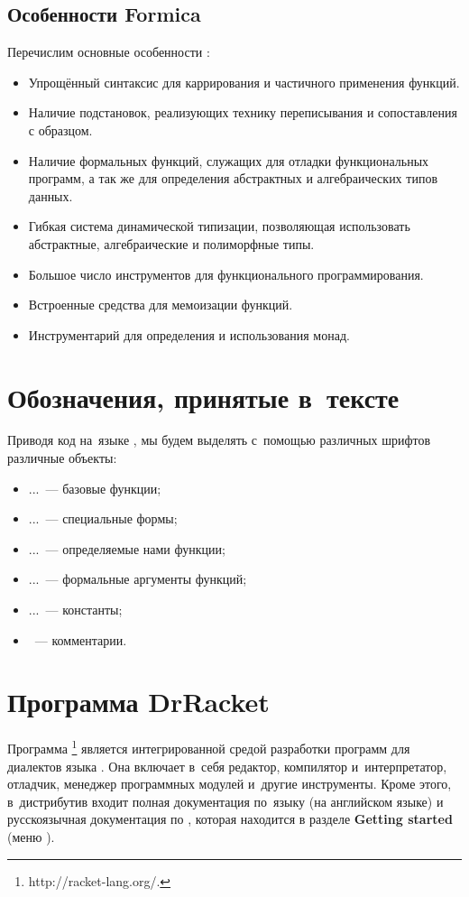 \subsection{Особенности Formica}%
Перечислим основные особенности \FLP:

\begin{itemize}
  \item Упрощённый синтаксис для каррирования и частичного применения функций.
  \item Наличие подстановок, реализующих технику переписывания и сопоставления с образцом.
  \item Наличие формальных функций, служащих для отладки функциональных программ, а так же для определения абстрактных и алгебраических типов данных.
  \item Гибкая система динамической типизации, позволяющая использовать абстрактные, алгебраические и полиморфные \mbox{типы}.
  \item Большое число инструментов для функционального программирования.
  \item Встроенные средства для мемоизации функций.
  \item Инструментарий для определения и использования монад.
\end{itemize}

\section{Обозначения, принятые в~тексте}%
Приводя код на~языке \Scheme, мы будем выделять с~помощью различных шрифтов различные объекты:

\begin{itemize}[\ ]
  \item {} ...~--- базовые функции; 
  \item {} ...~--- специальные формы;
  \item {} ...~--- определяемые нами функции;
  \item {} ...~--- формальные аргументы функций;
  \item {} ...~--- константы;
  \item {}~--- комментарии.
\end{itemize}

\newpage
\section[2]{Программа DrRacket}%
Программа \footnote{http://racket-lang.org/.} является интегрированной средой разработки программ для диалектов языка . Она включает в~себя редактор, компилятор и~интерпретатор, отладчик, менеджер программных модулей и~другие инструменты. Кроме этого, в~дистрибутив входит полная документация по~языку \Racket (на английском языке) и русскоязычная документация по \Scheme, которая находится в разделе \textbf{Getting started} (меню ).


